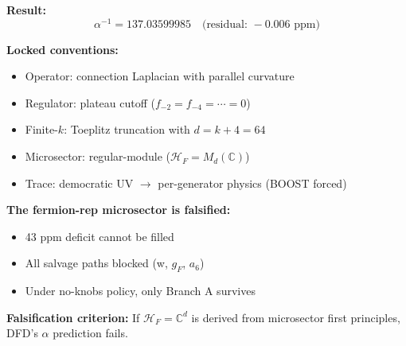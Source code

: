 \begin{tcolorbox}[colback=blue!5!white, colframe=blue!50!black, title=Summary: Convention-Locked $\alpha$]
\textbf{Result:}
\begin{equation}
\alpha^{-1} = 137.03599985 \quad \text{(residual: } {-}0.006\text{ ppm)}
\end{equation}

\textbf{Locked conventions:}
\begin{itemize}
\item Operator: connection Laplacian with parallel curvature
\item Regulator: plateau cutoff ($f_{-2} = f_{-4} = \cdots = 0$)
\item Finite-$k$: Toeplitz truncation with $d = k + 4 = 64$
\item Microsector: regular-module ($\mathcal{H}_F = M_d(\mathbb{C})$)
\item Trace: democratic UV $\to$ per-generator physics (BOOST forced)
\end{itemize}

\textbf{The fermion-rep microsector is falsified:}
\begin{itemize}
\item 43 ppm deficit cannot be filled
\item All salvage paths blocked (w, $g_F$, $a_6$)
\item Under no-knobs policy, only Branch A survives
\end{itemize}

\textbf{Falsification criterion:} If $\mathcal{H}_F = \mathbb{C}^d$ is derived from microsector first principles, DFD's $\alpha$ prediction fails.
\end{tcolorbox}
